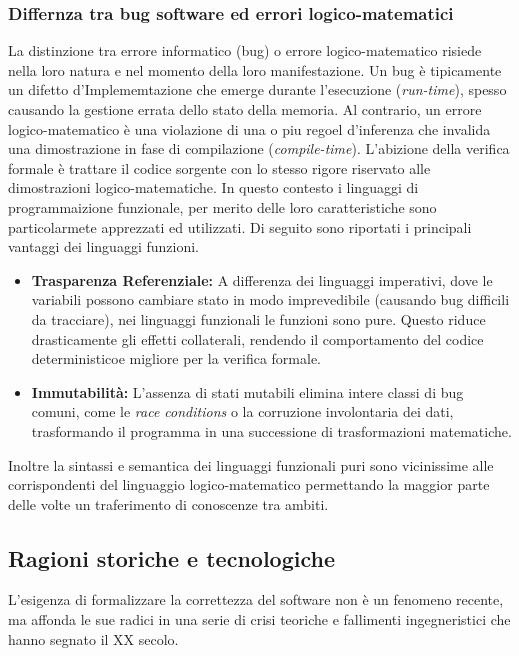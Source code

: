 \subsubsection{Differnza tra bug software ed errori logico-matematici}
La distinzione tra errore informatico (bug) o errore logico-matematico risiede nella loro natura e nel momento della loro manifestazione.
Un bug è tipicamente un difetto d'Implememtazione che emerge durante l'esecuzione (\emph{run-time}), spesso causando la gestione errata dello
stato della memoria. Al contrario, un errore logico-matematico è una violazione di una o piu regoel d'inferenza che invalida una dimostrazione
in fase di compilazione (\emph{compile-time}). L'abizione della verifica formale è trattare il codice sorgente con lo stesso rigore riservato
alle dimostrazioni logico-matematiche. In questo contesto i linguaggi di programmaizione funzionale, per merito delle loro caratteristiche sono
particolarmete apprezzati ed utilizzati. Di seguito sono riportati i principali vantaggi dei linguaggi funzioni.

\begin{itemize}
    \item \textbf{Trasparenza Referenziale:} 
        A differenza dei linguaggi imperativi, dove le variabili possono cambiare stato in modo imprevedibile (causando bug difficili da tracciare), 
        nei linguaggi funzionali le funzioni sono pure. Questo riduce drasticamente gli effetti collaterali, rendendo il comportamento del codice 
        deterministicoe migliore per la verifica formale.
    \item \textbf{Immutabilità:} 
        L'assenza di stati mutabili elimina intere classi di bug comuni, come le \emph{race conditions} o la corruzione involontaria dei dati, 
        trasformando il programma in una successione di trasformazioni matematiche.
\end{itemize}
Inoltre la sintassi e semantica dei linguaggi funzionali puri sono vicinissime alle corrispondenti del linguaggio logico-matematico permettando 
la maggior parte delle volte un traferimento di conoscenze tra ambiti.

\subsection{Ragioni storiche e tecnologiche}
L'esigenza di formalizzare la correttezza del software non è un fenomeno recente, 
ma affonda le sue radici in una serie di crisi teoriche e fallimenti ingegneristici che hanno segnato il XX secolo.

